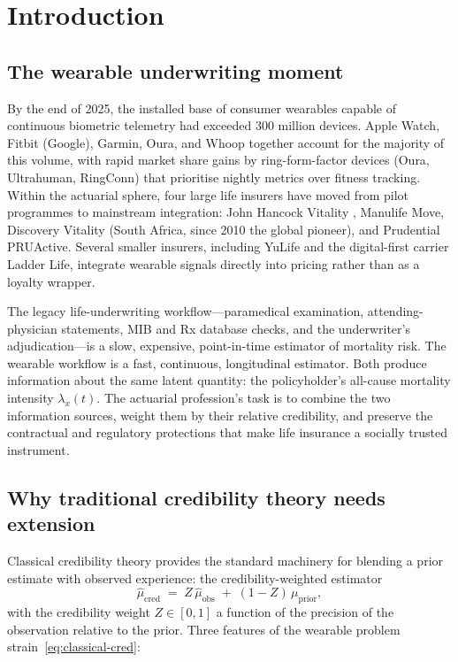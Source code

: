 
\section{Introduction}\label{sec:intro}

\subsection{The wearable underwriting moment}\label{ss:moment}

By the end of 2025, the installed base of consumer wearables capable
of continuous biometric telemetry had exceeded 300 million devices.
Apple Watch, Fitbit (Google), Garmin, Oura, and Whoop together account
for the majority of this volume, with rapid market share gains by
ring-form-factor devices (Oura, Ultrahuman, RingConn) that prioritise
nightly metrics over fitness tracking. Within the actuarial sphere,
four large life insurers have moved from pilot programmes to mainstream
integration: John Hancock Vitality \citep{Hancock2018}, Manulife Move,
Discovery Vitality (South Africa, since 2010 the global pioneer), and
Prudential PRUActive. Several smaller insurers, including YuLife and
the digital-first carrier Ladder Life, integrate wearable signals
directly into pricing rather than as a loyalty wrapper.

The legacy life-underwriting workflow---paramedical examination,
attending-physician statements, MIB and Rx database checks, and the
underwriter's adjudication---is a slow, expensive, point-in-time
estimator of mortality risk. The wearable workflow is a fast,
continuous, longitudinal estimator. Both produce information about the
same latent quantity: the policyholder's all-cause mortality intensity
$\lambda_x(t)$. The actuarial profession's task is to combine the two
information sources, weight them by their relative credibility, and
preserve the contractual and regulatory protections that make life
insurance a socially trusted instrument.

\subsection{Why traditional credibility theory needs extension}\label{ss:why-credibility}

Classical credibility theory \citep{Buhlmann1967,BuhlmannGisler2005}
provides the standard machinery for blending a prior estimate with
observed experience: the credibility-weighted estimator
\begin{equation}\label{eq:classical-cred}
   \hat\mu_{\mathrm{cred}} \;=\; Z\,\hat\mu_{\mathrm{obs}}
   \;+\; (1-Z)\,\mu_{\mathrm{prior}},
\end{equation}
with the credibility weight $Z\in[0,1]$ a function of the precision of
the observation relative to the prior. Three features of the wearable
problem strain~\eqref{eq:classical-cred}:

